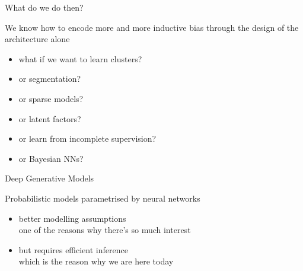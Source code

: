 \documentclass[14pt]{beamer}
\begin{document}
\begin{frame}{What do we do then?}

\begin{small}
\begin{figure}
\end{figure}
\end{small}
We know how to encode more and more inductive bias through the design of the architecture alone
\begin{small}
\pause
\begin{multicols}{2}
	\begin{itemize}
		\item what if we want to learn clusters?
		\item or segmentation?
		\item or sparse models?
		\item or latent factors?
		\item or learn from incomplete supervision?
		\item or Bayesian NNs?
	\end{itemize}
\end{multicols}
\end{small}

\end{frame}

\begin{frame}{Deep Generative Models}

Probabilistic models parametrised by neural networks
\begin{itemize}
	\pause
	\item better modelling assumptions\\
	one of the reasons why there's so much interest	
	\pause
	\item but requires efficient inference\\
	\pause
	\alert{which is the reason why we are here today}
\end{itemize}

\end{frame}
\end{document}

